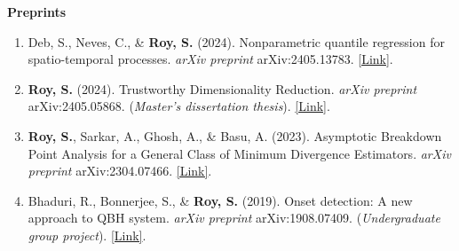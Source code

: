 \documentclass[10pt]{developercv} %
\begin{document}
\vspace*{0.3cm}
\textbf{Preprints}
\begin{enumerate}
    \item Deb, S., Neves, C., \& \textbf{Roy, S.} (2024). Nonparametric quantile regression for spatio-temporal processes. \emph{arXiv preprint} arXiv:2405.13783. \href{https://arxiv.org/abs/2405.13783}{[Link]}.
    \item \textbf{Roy, S.} (2024). Trustworthy Dimensionality Reduction. \emph{arXiv preprint} arXiv:2405.05868. (\textit{Master's dissertation thesis}). \href{https://arxiv.org/abs/2405.05868}{[Link]}.
    \item \textbf{Roy, S.}, Sarkar, A., Ghosh, A., \& Basu, A. (2023). Asymptotic Breakdown Point Analysis for a General Class of Minimum Divergence Estimators. \emph{arXiv preprint} arXiv:2304.07466. \href{https://arxiv.org/abs/2304.07466}{[Link]}.
    \item Bhaduri, R., Bonnerjee, S., \& \textbf{Roy, S.} (2019). Onset detection: A new approach to QBH system. \emph{arXiv preprint} arXiv:1908.07409. (\textit{Undergraduate group project}). \href{https://arxiv.org/abs/1908.07409}{[Link]}.
\end{enumerate}
\end{document}

